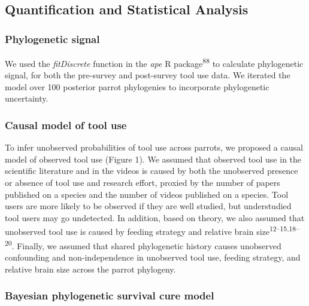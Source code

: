 \documentclass[
  man, donotrepeattitle,floatsintext]{apa6}
\begin{document}
\hypertarget{quantification-and-statistical-analysis}{%
\subsection{Quantification and Statistical Analysis}\label{quantification-and-statistical-analysis}}

\hypertarget{phylogenetic-signal}{%
\subsubsection{Phylogenetic signal}\label{phylogenetic-signal}}

We used the \emph{fitDiscrete} function in the \emph{ape} R package\textsuperscript{88} to
calculate phylogenetic signal, for both the pre-survey and post-survey tool use
data. We iterated the model over 100 posterior parrot phylogenies to incorporate
phylogenetic uncertainty.

\hypertarget{causal-model-of-tool-use}{%
\subsubsection{Causal model of tool use}\label{causal-model-of-tool-use}}

To infer unobserved probabilities of tool use across parrots, we proposed a
causal model of observed tool use (Figure 1). We assumed that
observed tool use in the scientific literature and in the videos is caused by
both the unobserved presence or absence of tool use and research effort, proxied
by the number of papers published on a species and the number of videos
published on a species. Tool users are more likely to be observed if they are
well studied, but understudied tool users may go undetected. In addition, based
on theory, we also assumed that unobserved tool use is caused by feeding
strategy and relative brain size\textsuperscript{12--15,18--20}. Finally, we
assumed that shared phylogenetic history causes unobserved confounding and
non-independence in unobserved tool use, feeding strategy, and relative brain
size across the parrot phylogeny.

\hypertarget{bayesian-phylogenetic-survival-cure-model}{%
\subsubsection{Bayesian phylogenetic survival cure model}\label{bayesian-phylogenetic-survival-cure-model}}
\end{document}
